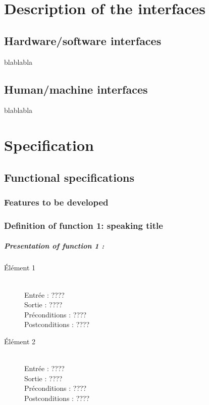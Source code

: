 \documentclass{polytech/polytech}
\numberwithin{figure}{chapter}
\begin{document}
\begin{appendix}
\chapter{Description of the interfaces}

\section{Hardware/software interfaces}

blablabla

\section{Human/machine interfaces}

blablabla

\chapter{Specification}

\section{Functional specifications}

\subsection{Features to be developed}



\subsection{Definition of function 1: speaking title}

\paragraph{Presentation of function 1 :}
 
\begin{description}
    \item[Élément 1] ~ \\
        Entrée : ???? \\
        Sortie : ???? \\
        Préconditions : ???? \\
        Postconditions : ????
    \item[Élément 2] ~ \\
        Entrée : ???? \\
        Sortie : ???? \\
        Préconditions : ???? \\
        Postconditions : ????
\end{description}


\end{appendix}
\end{document}
